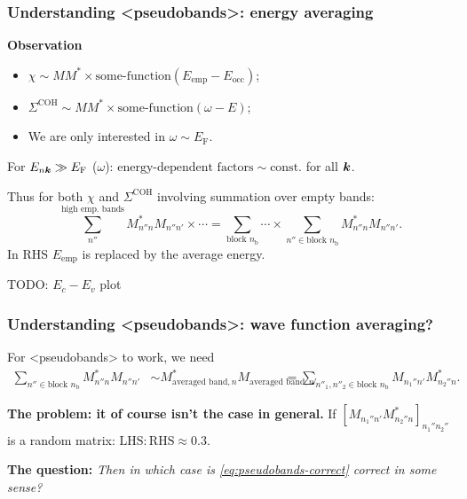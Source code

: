 \documentclass[t]{beamer}
\newcommand{\shortcode}[1]{\texttt{#1}}
\newcommand*{\const}{\text{const}}
\def\\{}%
\def\texttt#1{<#1>}%
\begin{document}
\begin{frame}[allowframebreaks]
\frametitle{Understanding \shortcode{pseudobands}: energy averaging}

\textbf{Observation} 
\begin{itemize}
    \item $\chi \sim M M^* \times \text{some-function}(E_{\text{emp}} - E_{\text{occ}})$;
    \item $\Sigma^{\text{COH}} \sim M M^* \times \text{some-function}(\omega - E)$; 
    \item We are only interested in $\omega \sim E_{\text{F}}$.
\end{itemize}

\vspace{0.5cm}

\faHandPointRight For $E_{n \vb*{k}} \gg E_{\text{F}}$ ($\omega$):  
$\text{energy-dependent factors} \sim \const.$ for all $\vb*{k}$.

\vspace{0.5cm}

Thus for both $\chi$ and $\Sigma^{\text{COH}}$ involving summation over empty bands:
\begin{equation}
    \sum_{n''}^{\text{high emp. bands}} M_{n'' n}^* M_{n'' n'} \times \cdots 
    = \sum_{\text{block $n_{\text{b}}$}} \cdots \times \sum_{n'' \in \text{block $n_{\text{b}}$}}
    M_{n'' n}^* M_{n'' n'}.
\end{equation}
In RHS $E_{\text{emp}}$ is replaced by the average energy.

\framebreak

TODO: $E_c - E_v$ plot

\end{frame}

\begin{frame}
\frametitle{Understanding \shortcode{pseudobands}: wave function averaging?}

For \shortcode{pseudobands} to work, we need 
\begin{equation}
    \begin{aligned}
        \sum_{n'' \in \text{block $n_{\text{b}}$}} M_{n'' n}^* M_{n'' n'} 
        &\sim M_{\text{averaged band}, n}^* M_{\text{averaged band}, n'} \\
        &= \sum_{n''_1, n''_2 \in \text{block $n_{\text{b}}$}} M_{n_1'' n'} M_{n_2'' n}^*.
    \end{aligned}
    \label{eq:pseudobands-correct}
\end{equation}

\textbf{The problem: it of course isn't the case in general.}
If $[M_{n_1'' n'} M_{n_2'' n}^*]_{n_1'' n_2''}$ is a random matrix: 
$\text{LHS}:\text{RHS} \approx 0.3$.

\vspace{0.5cm}

\textbf{The question:} \emph{Then in which case is \eqref{eq:pseudobands-correct} correct in some sense?} 

\end{frame}
\end{document}
